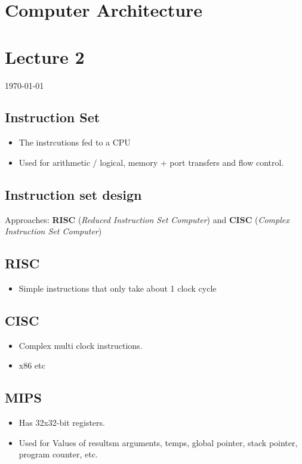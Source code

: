 \documentclass[12pt]{article}
\begin{document}
{\centering
\section*{Computer Architecture}
\section*{Lecture 2}
\indent\today
}

\subsection*{Instruction Set}
\begin{itemize}
    \item The instrcutions fed to a CPU
    \item Used for arithmetic / logical, memory + port transfers and flow control.
\end{itemize}
\subsection*{Instruction set design}
Approaches: \textbf{RISC} (\textit{Reduced Instruction Set Computer}) and \textbf{CISC} (\textit{Complex Instruction Set Computer})
\subsection*{RISC}
\begin{itemize}
    \item Simple instructions that only take about 1 clock cycle
\end{itemize}
\subsection*{CISC}
\begin{itemize}
    \item Complex multi clock instructions.
    \item x86 etc
\end{itemize}

\subsection*{MIPS}
\begin{itemize}
    \item Has 32x32-bit registers.
    \item Used for Values of resultsm arguments, temps, global pointer, stack pointer, program counter, etc.
\end{itemize}
\end{document}
